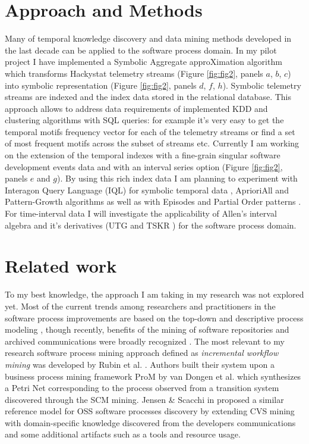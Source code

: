 \documentclass[11pt,oneside]{article}
\begin{document}
\section{Approach and Methods}
Many of temporal knowledge discovery and data mining methods developed in the last decade can be applied to the software process domain. In my pilot project I have implemented a Symbolic Aggregate approXimation algorithm \cite{citeulike:2821475} which transforms Hackystat telemetry streams (Figure \ref{fig:fig2}, panels $a$, $b$, $c$) into symbolic representation (Figure \ref{fig:fig2}, panels $d$, $f$, $h$). Symbolic telemetry streams are indexed and the index data stored in the relational database. This approach allows to address data requirements of implemented KDD and clustering algorithms with SQL queries: for example it's very easy to get the temporal motifs frequency vector for each of the telemetry streams or find a set of most frequent motifs across the subset of streams etc. Currently I am working on the extension of the temporal indexes with a fine-grain singular software development events data and with an interval series option (Figure \ref{fig:fig2}, panels $e$ and $g$). By using this rich index data I am planning to experiment with Interagon Query Language (IQL) for symbolic temporal data \cite{citeulike:5043086}, AprioriAll \cite{citeulike:775528} and Pattern-Growth algorithms \cite{citeulike:5043097} as well as with Episodes \cite{citeulike:5043099} and Partial Order patterns \cite{citeulike:5043101}. For time-interval data I will investigate the applicability of Allen's interval algebra \cite{citeulike:191348} and it's derivatives (UTG \cite{citeulike:5043086} and TSKR \cite{citeulike:3978076}) for the software process domain. 
\section{Related work}
To my best knowledge, the approach I am taking in my research was not explored yet. Most of the current trends among researchers and practitioners in the software process improvements are based on the top-down and descriptive process modeling \cite{citeulike:5043670}, though recently, benefits of the mining of software repositories and archived communications were broadly recognized \cite{citeulike:5043676}. The most relevant to my research software process mining approach defined as \textit{incremental workflow mining} was developed by Rubin et al. \cite{citeulike:1885717}. Authors built their system upon a business process mining framework ProM by van Dongen et al. \cite{citeulike:5043673} which synthesizes a Petri Net corresponding to the process observed from a transition system discovered through the SCM mining. Jensen \& Scacchi in \cite{citeulike:5043664} proposed a similar reference model for OSS software processes discovery by extending CVS mining with domain-specific knowledge discovered from the developers communications and some additional artifacts such as a tools and resource usage. 
\end{document}
